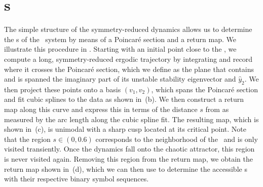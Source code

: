 \section{\Po s}
\label{s:numerics}

The simple structure of the symmetry-reduced dynamics allows us to
determine the \rpo s of the \twomode\ system by means of a Poincar\'e
section and a return map. We illustrate this procedure in
. Starting with an initial point close to the
\REQV{}{}, we compute a long, symmetry-reduced ergodic trajectory by integrating
 and record where it crosses the Poincar\'e section, which we
define as the plane that contains \REQV{}{} and is spanned the imaginary part of its unstable stability
eigenvector and $\hat{y}_2$.
We then project these points onto a basis $(v_1, v_2)$, which
spans the Poincar\'e section and fit cubic splines to the data as shown in \,(b).
We then construct a return map along this curve and express this in terms of the distance $s$ from \REQV{}{}
as measured by the arc length along the cubic spline fit. The resulting map, which is shown in
\,(c), is unimodal with a sharp cusp located at its critical point.
Note that the region $s \in (0, 0.6)$ corresponds to
the neighborhood of the \reqv\  and is only visited transiently. Once the dynamics fall onto the chaotic
attractor, this region is never visited again. Removing this region from the return map, we
obtain the return map shown in \,(d), which we can then use to determine the
accessible \rpo s  with their respective binary symbol sequences.

